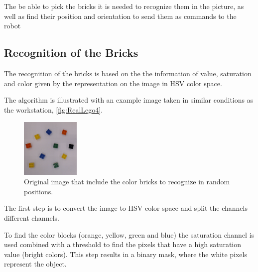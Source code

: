 \chapter{}\label{chap:bricks}
The be able to pick the bricks it is needed to recognize them in the picture, as well as find their position and orientation to send them as commands to the robot

\section{Recognition of the Bricks}
The recognition of the bricks is based on the the information of value, saturation and color given by the representation on the image in HSV color space.

The algorithm is illustrated with an example image taken in similar conditions as the workstation, \autoref{fig:RealLego4}.

\begin{figure}[H]
    \includegraphics[width=0.25\textwidth]{figures/original.png}
    \caption{Original image that include the color bricks to recognize in random positions.}
    \label{fig:RealLego4}
\end{figure}

The first step is to convert the image to HSV color space and split the channels different channels.

To find the color blocks (orange, yellow, green and blue) the saturation channel is used combined with a threshold to find the pixels that have a high saturation value (bright colors). This step results in a binary mask, where the white pixels represent the object.

